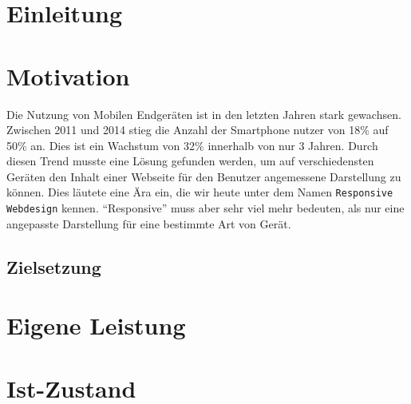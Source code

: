 \section{Einleitung} %
\label{sec:einleitung}




\section{Motivation} %
\label{sub:motivation}
	Die Nutzung von Mobilen Endgeräten ist in den letzten Jahren stark gewachsen. Zwischen 2011 und 2014 stieg die Anzahl der Smartphone nutzer von 18\% auf 50\% an. Dies ist ein Wachstum von 32\% innerhalb von nur 3 Jahren.\autocite{tns14} Durch diesen Trend musste eine Lösung gefunden werden, um auf verschiedensten Geräten den Inhalt einer Webseite für den Benutzer angemessene Darstellung zu können. Dies läutete eine Ära ein, die wir heute unter dem Namen \texttt{Responsive Webdesign} kennen. "`Responsive"' muss aber sehr viel mehr bedeuten, als nur eine angepasste Darstellung für eine bestimmte Art von Gerät.\\




\subsection{Zielsetzung} %
\label{sub:zielsetzung}




\section{Eigene Leistung} %
\label{sub:eigene_leistung}




\section{Ist-Zustand} %
\label{sec:Ist-Zustand}

